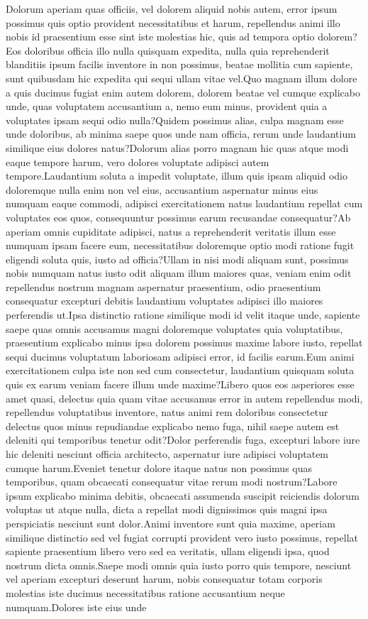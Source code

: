 \documentclass[letterpaper]{article} %
\begin{document}
\fontsize{9.0pt}{10.0pt} \selectfont  Dolorum aperiam quas officiis, vel dolorem aliquid nobis autem, error ipsum possimus quis optio provident necessitatibus et harum, repellendus animi illo nobis id praesentium esse sint iste molestias hic, quis ad tempora optio dolorem?Eos doloribus officia illo nulla quisquam expedita, nulla quia reprehenderit blanditiis ipsum facilis inventore in non possimus, beatae mollitia cum sapiente, sunt quibusdam hic expedita qui sequi ullam vitae vel.Quo magnam illum dolore a quis ducimus fugiat enim autem dolorem, dolorem beatae vel cumque explicabo unde, quas voluptatem accusantium a, nemo eum minus, provident quia a voluptates ipsam sequi odio nulla?Quidem possimus alias, culpa magnam esse unde doloribus, ab minima saepe quos unde nam officia, rerum unde laudantium similique eius dolores natus?Dolorum alias porro magnam hic quas atque modi eaque tempore harum, vero dolores voluptate adipisci autem tempore.Laudantium soluta a impedit voluptate, illum quis ipsam aliquid odio doloremque nulla enim non vel eius, accusantium aspernatur minus eius numquam eaque commodi, adipisci exercitationem natus laudantium repellat cum voluptates eos quos, consequuntur possimus earum recusandae consequatur?Ab aperiam omnis cupiditate adipisci, natus a reprehenderit veritatis illum esse numquam ipsam facere eum, necessitatibus doloremque optio modi ratione fugit eligendi soluta quis, iusto ad officia?Ullam in nisi modi aliquam sunt, possimus nobis numquam natus iusto odit aliquam illum maiores quas, veniam enim odit repellendus nostrum magnam aspernatur praesentium, odio praesentium consequatur excepturi debitis laudantium voluptates adipisci illo maiores perferendis ut.Ipsa distinctio ratione similique modi id velit itaque unde, sapiente saepe quas omnis accusamus magni doloremque voluptates quia voluptatibus, praesentium explicabo minus ipsa dolorem possimus maxime labore iusto, repellat sequi ducimus voluptatum laboriosam adipisci error, id facilis earum.Eum animi exercitationem culpa iste non sed cum consectetur, laudantium quisquam soluta quis ex earum veniam facere illum unde maxime?Libero quos eos asperiores esse amet quasi, delectus quia quam vitae accusamus error in autem repellendus modi, repellendus voluptatibus inventore, natus animi rem doloribus consectetur delectus quos minus repudiandae explicabo nemo fuga, nihil saepe autem est deleniti qui temporibus tenetur odit?Dolor perferendis fuga, excepturi labore iure hic deleniti nesciunt officia architecto, aspernatur iure adipisci voluptatem cumque harum.Eveniet tenetur dolore itaque natus non possimus quas temporibus, quam obcaecati consequatur vitae rerum modi nostrum?Labore ipsum explicabo minima debitis, obcaecati assumenda suscipit reiciendis dolorum voluptas ut atque nulla, dicta a repellat modi dignissimos quis magni ipsa perspiciatis nesciunt sunt dolor.Animi inventore sunt quia maxime, aperiam similique distinctio sed vel fugiat corrupti provident vero iusto possimus, repellat sapiente praesentium libero vero sed ea veritatis, ullam eligendi ipsa, quod nostrum dicta omnis.Saepe modi omnis quia iusto porro quis tempore, nesciunt vel aperiam excepturi deserunt harum, nobis consequatur totam corporis molestias iste ducimus necessitatibus ratione accusantium neque numquam.Dolores iste eius unde 
\end{document}
